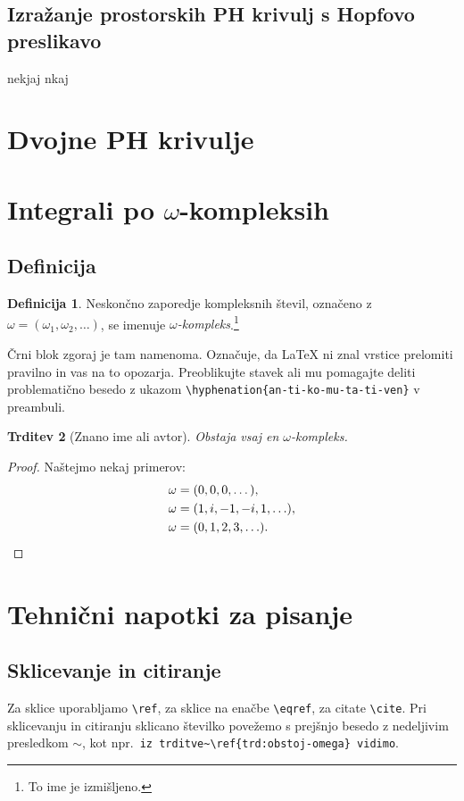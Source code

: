 \documentclass[12pt,a4paper,twoside]{article}
\theoremstyle{definition} %
\newtheorem{definicija}{Definicija}[section]
\theoremstyle{plain} %
\newtheorem{trditev}[definicija]{Trditev}
\numberwithin{equation}{section}  %
\begin{document}
\subsection{Izražanje prostorskih PH krivulj s Hopfovo preslikavo}
nekjaj nkaj

\section{Dvojne PH krivulje}
\section{Integrali po \texorpdfstring{$\omega$}{ω}-kompleksih}
\subsection{Definicija}
\begin{definicija}
  Neskončno zaporedje kompleksnih števil, označeno z $\omega = (\omega_1, \omega_2, \ldots)$,
  se imenuje \emph{$\omega$-kompleks}.\footnote{To ime je izmišljeno.}

  Črni blok zgoraj je tam namenoma. Označuje, da \LaTeX{} ni znal vrstice prelomiti pravilno
  in vas na to opozarja. Preoblikujte stavek ali mu pomagajte deliti problematično besedo z
  ukazom \verb|\hyphenation{an-ti-ko-mu-ta-ti-ven}| v preambuli.
\end{definicija}
\begin{trditev}[Znano ime ali avtor]
  \label{trd:obstoj-omega}
  Obstaja vsaj en $\omega$-kompleks.
\end{trditev}
\begin{proof}
  Naštejmo nekaj primerov:
  \begin{align}
    \omega &= (0, 0, 0, \dots), \label{eq:zero-kompleks} \\
    \omega &= (1, i, -1, -i, 1, \ldots), \nonumber \\
    \omega &= (0, 1, 2, 3, \ldots). \nonumber \qedhere  %
  \end{align}
\end{proof}

\section{Tehnični napotki za pisanje}

\subsection{Sklicevanje in citiranje}
Za sklice uporabljamo \verb|\ref|, za sklice na enačbe \verb|\eqref|, za citate \verb|\cite|. Pri
sklicevanju in citiranju sklicano številko povežemo s prejšnjo besedo z nedeljivim presledkom
$\sim$, kot npr.\ \verb|iz trditve~\ref{trd:obstoj-omega} vidimo|.
\end{document}
